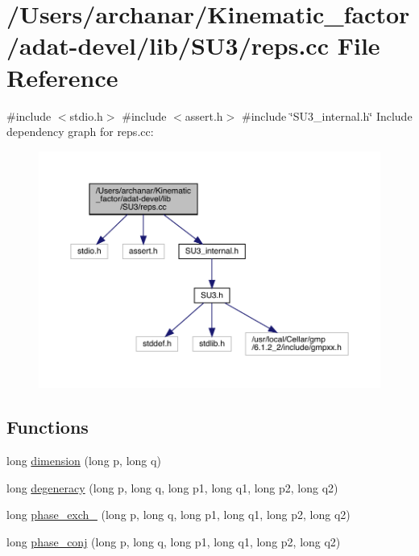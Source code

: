 \hypertarget{adat-devel_2lib_2SU3_2reps_8cc}{}\section{/\+Users/archanar/\+Kinematic\+\_\+factor/adat-\/devel/lib/\+S\+U3/reps.cc File Reference}
\label{adat-devel_2lib_2SU3_2reps_8cc}
{\ttfamily \#include $<$stdio.\+h$>$}\newline
{\ttfamily \#include $<$assert.\+h$>$}\newline
{\ttfamily \#include \char`\"{}S\+U3\+\_\+internal.\+h\char`\"{}}\newline
Include dependency graph for reps.\+cc\+:
\nopagebreak
\begin{figure}[H]
\begin{center}
\leavevmode
\includegraphics[width=350pt]{d2/d50/adat-devel_2lib_2SU3_2reps_8cc__incl}
\end{center}
\end{figure}
\subsection*{Functions}
\begin{DoxyCompactItemize}
\item 
long \mbox{\hyperlink{adat-devel_2lib_2SU3_2reps_8cc_a8251acad9553aca00780cebfaaba4d03}{dimension}} (long p, long q)
\item 
long \mbox{\hyperlink{adat-devel_2lib_2SU3_2reps_8cc_a4ec52994cdf819e465b0743295228e5e}{degeneracy}} (long p, long q, long p1, long q1, long p2, long q2)
\item 
long \mbox{\hyperlink{adat-devel_2lib_2SU3_2reps_8cc_aa2fc81838328560e24ea8a4c4d4c02be}{phase\+\_\+exch\+\_}} (long p, long q, long p1, long q1, long p2, long q2)
\item 
long \mbox{\hyperlink{adat-devel_2lib_2SU3_2reps_8cc_a0b98dde903eb63eb5e4ad4aefa492787}{phase\+\_\+conj}} (long p, long q, long p1, long q1, long p2, long q2)
\end{DoxyCompactItemize}


